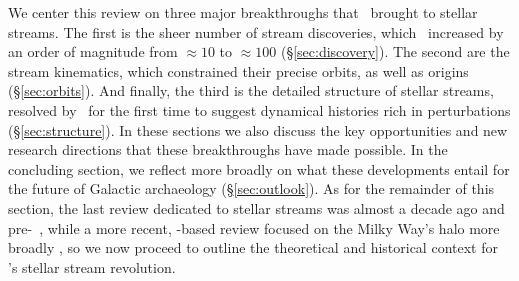 \documentclass[final,5p,times,twocolumn,authoryear]{elsarticle}
\begin{document}
We center this review on three major breakthroughs that \gaia\ brought to stellar streams.
The first is the sheer number of stream discoveries, which \gaia\ increased by an order of magnitude from $\approx10$ to $\approx100$ (\S\ref{sec:discovery}).
The second are the stream kinematics, which constrained their precise orbits, as well as origins (\S\ref{sec:orbits}).
And finally, the third is the detailed structure of stellar streams, resolved by \gaia\ for the first time to suggest dynamical histories rich in perturbations (\S\ref{sec:structure}).
In these sections we also discuss the key opportunities and new research directions that these breakthroughs have made possible.
In the concluding section, we reflect more broadly on what these developments entail for the future of Galactic archaeology (\S\ref{sec:outlook}).
As for the remainder of this section, the last review dedicated to stellar streams was almost a decade ago and pre-\gaia\ \citep{newberg:2016}, while a more recent, \gaia-based review focused on the Milky Way's halo more broadly \citep{helmi:2020}, so we now proceed to outline the theoretical and historical context for \gaia's stellar stream revolution.
\end{document}
